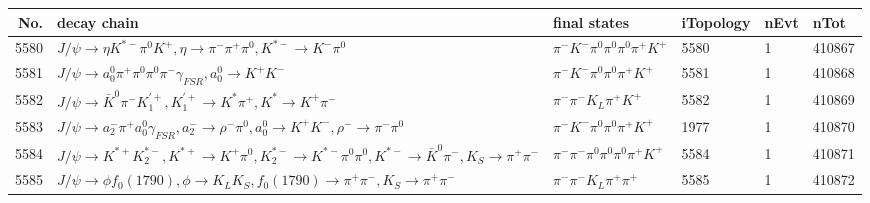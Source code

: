 \begin{table}[htbp] 
\begin{center}
\begin{small}
\begin{tabular}{rlllll}\hline\hline
 No. & decay chain & final states &  iTopology & nEvt & nTot \\\hline
5580&$J/\psi       \rightarrow \eta          K^{*-}         \pi^{0}        K^{+}          , \eta           \rightarrow \pi^{-}        \pi^{+}        \pi^{0}        , K^{*-}          \rightarrow K^{-}          \pi^{0}        $&$\pi^{-}        K^{-}          \pi^{0}        \pi^{0}        \pi^{0}        \pi^{+}        K^{+}          $& 5580&    1&410867\\
5581&$J/\psi       \rightarrow a_{0}^{0}      \pi^{+}        \pi^{0}        \pi^{0}        \pi^{-}        \gamma_{FSR} , a_{0}^{0}       \rightarrow K^{+}          K^{-}          $&$\pi^{-}        K^{-}          \pi^{0}        \pi^{0}        \pi^{+}        K^{+}          $& 5581&    1&410868\\
5582&$J/\psi       \rightarrow \bar{K}^{0}   \pi^{-}        K_1^{'+}      , K_1^{'+}       \rightarrow K^{*}          \pi^{+}        , K^{*}           \rightarrow K^{+}          \pi^{-}        $&$\pi^{-}        \pi^{-}        K_{L}          \pi^{+}        K^{+}          $& 5582&    1&410869\\
5583&$J/\psi       \rightarrow a_{2}^{-}      \pi^{+}        a_{0}^{0}      \gamma_{FSR} , a_{2}^{-}       \rightarrow \rho^{-}      \pi^{0}        , a_{0}^{0}       \rightarrow K^{+}          K^{-}          , \rho^{-}       \rightarrow \pi^{-}        \pi^{0}        $&$\pi^{-}        K^{-}          \pi^{0}        \pi^{0}        \pi^{+}        K^{+}          $& 1977&    1&410870\\
5584&$J/\psi       \rightarrow K^{*+}         K_2^{*-}       , K^{*+}          \rightarrow K^{+}          \pi^{0}        , K_2^{*-}        \rightarrow K^{*-}         \pi^{0}        \pi^{0}        , K^{*-}          \rightarrow \bar{K}^{0}   \pi^{-}        , K_{S}           \rightarrow \pi^{+}        \pi^{-}        $&$\pi^{-}        \pi^{-}        \pi^{0}        \pi^{0}        \pi^{0}        \pi^{+}        K^{+}          $& 5584&    1&410871\\
5585&$J/\psi       \rightarrow \phi           f_{0}(1790)    , \phi            \rightarrow K_{L}          K_{S}          , f_{0}(1790)     \rightarrow \pi^{+}        \pi^{-}        , K_{S}           \rightarrow \pi^{+}        \pi^{-}        $&$\pi^{-}        \pi^{-}        K_{L}          \pi^{+}        \pi^{+}        $& 5585&    1&410872\\

\end{tabular}
\end{small}
\end{center}
\end{table}
